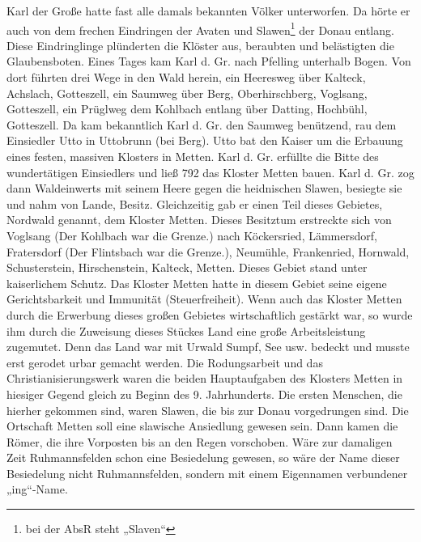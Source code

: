 \documentclass[12pt,a4paper]{book}
\begin{document}
Karl der Große hatte fast alle damals bekannten Völker unterworfen. Da hörte er
auch von dem frechen Eindringen der Avaten und Slawen\footnote{bei der AbsR
steht „Slaven“} der Donau entlang. Diese Eindringlinge plünderten die Klöster
aus, beraubten und belästigten die Glaubensboten. Eines Tages kam Karl d. Gr.
nach Pfelling unterhalb Bogen. Von dort führten drei Wege in den Wald herein,
ein Heeresweg über Kalteck, Achslach, Gotteszell, ein Saumweg über Berg,
Oberhirschberg, Voglsang, Gotteszell, ein Prüglweg dem Kohlbach entlang über
Datting, Hochbühl, Gotteszell. Da kam bekanntlich Karl d. Gr. den Saumweg
benützend, rau dem Einsiedler Utto in Uttobrunn (bei Berg). Utto bat den Kaiser
um die Erbauung eines festen, massiven Klosters in Metten. Karl d. Gr. erfüllte
die Bitte des wundertätigen Einsiedlers und ließ 792 das Kloster Metten bauen.
Karl d. Gr. zog dann Waldeinwerts mit seinem Heere gegen die heidnischen Slawen,
besiegte sie und nahm von Lande, Besitz. Gleichzeitig gab er einen Teil dieses
Gebietes, Nordwald genannt, dem Kloster Metten. Dieses Besitztum erstreckte sich
von Voglsang (Der Kohlbach war die Grenze.) nach Köckersried, Lämmersdorf,
Fratersdorf (Der Flintsbach war die Grenze.), Neumühle, Frankenried, Hornwald,
Schusterstein, Hirschenstein, Kalteck, Metten. Dieses Gebiet stand unter
kaiserlichem Schutz. Das Kloster Metten hatte in diesem Gebiet seine eigene
Gerichtsbarkeit und Immunität (Steuerfreiheit). Wenn auch das Kloster Metten
durch die Erwerbung dieses großen Gebietes wirtschaftlich gestärkt war, so wurde
ihm durch die Zuweisung dieses Stückes Land eine große Arbeitsleistung
zugemutet. Denn das Land war mit Urwald Sumpf, See usw. bedeckt und musste erst
gerodet urbar gemacht werden. Die Rodungsarbeit und das Christianisierungswerk
waren die beiden Hauptaufgaben des Klosters Metten in hiesiger Gegend gleich zu
Beginn des 9. Jahrhunderts. Die ersten Menschen, die hierher gekommen sind,
waren Slawen, die bis zur Donau vorgedrungen sind. Die Ortschaft Metten soll
eine slawische Ansiedlung gewesen sein. Dann kamen die Römer, die ihre Vorposten
bis an den Regen vorschoben. Wäre zur damaligen Zeit Ruhmannsfelden schon eine
Besiedelung gewesen, so wäre der Name dieser Besiedelung nicht Ruhmannsfelden,
sondern mit einem Eigennamen verbundener „ing“-Name.
\end{document}

